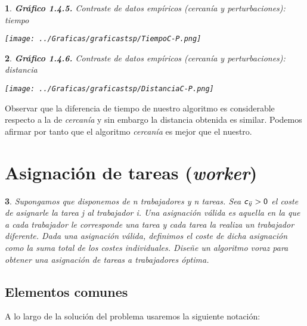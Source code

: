 \documentclass[10pt, a4paper]{article}
\theoremstyle{theorem-style}
\newtheorem*{datos}{}
\theoremstyle{theorem-style}
\theoremstyle{definition-style}
\theoremstyle{remark-style}
\theoremstyle{example-style}
\theoremstyle{definition-style}
\theoremstyle{remark-style}
\begin{document}
\begin{datos}
	{\bf\sffamily Gráfico 1.4.5.} {\sffamily Contraste de datos empíricos (cercanía y perturbaciones): tiempo}\\
	\vspace{-0.7cm}
	\begin{center}
		\texttt{[image: ../Graficas/graficastsp/TiempoC-P.png]}
	\end{center}	
\end{datos}
\begin{datos}
	{\bf\sffamily Gráfico 1.4.6.} {\sffamily Contraste de datos empíricos (cercanía y perturbaciones): distancia}\\
	\vspace{-0.7cm}
	\begin{center}
		\texttt{[image: ../Graficas/graficastsp/DistanciaC-P.png]}
	\end{center}	
\end{datos}

Observar que la diferencia de tiempo de nuestro algoritmo es considerable respecto a la de \emph{cercanía} y sin embargo la distancia obtenida es similar. Podemos afirmar por tanto que el algoritmo \emph{cercanía} es mejor que el nuestro. 

\pagebreak

\section{Asignación de tareas (\emph{worker})}

\begin{datos}
	{\sffamily Supongamos que disponemos de \emph{n} trabajadores y \emph{n} tareas. Sea $\text{\sffamily \emph{c}}_\text{\sffamily \emph{ij}} > \text{\sffamily 0}$ el coste de asignarle la tarea \emph{j} al trabajador \emph{i}. Una asignación válida es aquella en la que a cada trabajador le corresponde una tarea y cada tarea la realiza un trabajador diferente. Dada una asignación válida, definimos el coste de dicha asignación como la suma total de los costes individuales. Diseñe un algoritmo voraz para obtener una asignación de tareas a trabajadores óptima.}
\end{datos}

\subsection*{Elementos comunes}

A lo largo de la solución del problema usaremos la siguiente notación:
\end{document}
